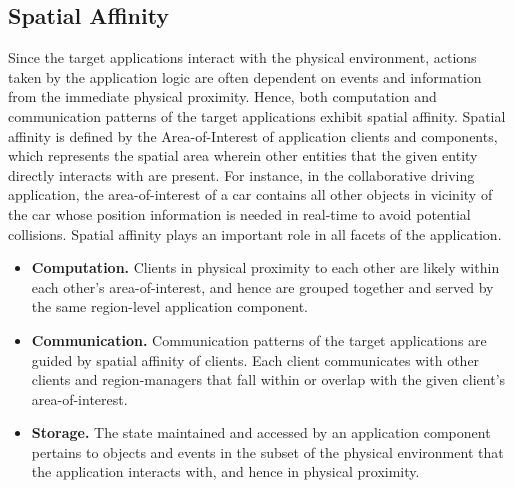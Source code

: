 \subsection{Spatial Affinity}
\label{sec:spatial_affinity}
Since the target applications interact with the physical environment, actions taken by the application logic are often dependent on events and information from the immediate physical proximity. Hence, both computation and communication patterns of the target applications exhibit spatial affinity. Spatial affinity is defined by the Area-of-Interest of application clients and components, which represents the spatial area wherein other entities that the given entity directly interacts with are present. For instance, in the collaborative driving application, the area-of-interest of a car contains all other objects in vicinity of the car whose position information is needed in real-time to avoid potential collisions. Spatial affinity plays an important role in all facets of the application.
\begin{itemize}
\item \textbf{Computation. }Clients in physical proximity to each other are likely within each other's area-of-interest, and hence are grouped together and served by the same region-level application component. 
\item \textbf{Communication. } Communication patterns of the target applications are guided by spatial affinity of clients. Each client communicates with other clients and region-managers that fall within or overlap with the given client's area-of-interest. 
\item \textbf{Storage. }The state maintained and accessed by an application component pertains to objects and events in the subset of the physical environment that the application interacts with, and hence in physical proximity.
\end{itemize}


